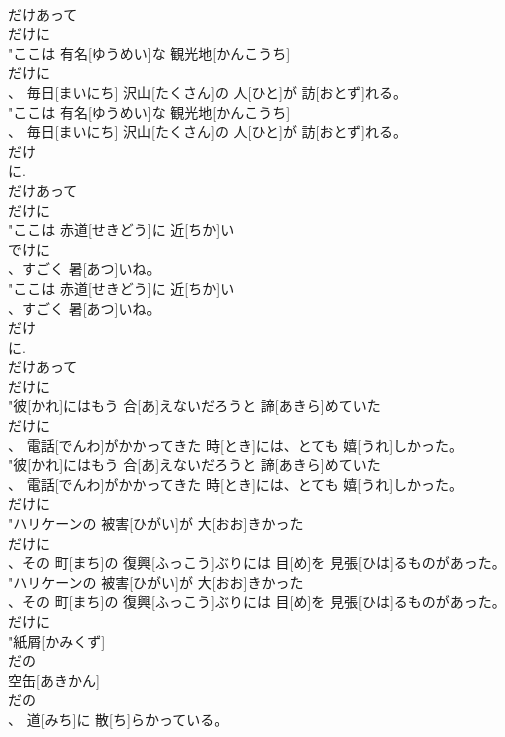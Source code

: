 \documentclass[8pt]{extreport}
\begin{document}
\begin{CJK}{UTF8}{min}
\\	だけあって	
\\	だけに
\\	"ここは 有名[ゆうめい]な 観光地[かんこうち]
\\	だけに
\\	、 毎日[まいにち] 沢山[たくさん]の 人[ひと]が 訪[おとず]れる。
\\	"ここは 有名[ゆうめい]な 観光地[かんこうち]
\\	、 毎日[まいにち] 沢山[たくさん]の 人[ひと]が 訪[おとず]れる。
\\	だけ 
\\	に. 
\\	だけあって	
\\	だけに
\\	"ここは 赤道[せきどう]に 近[ちか]い
\\	でけに
\\	、すごく 暑[あつ]いね。
\\	"ここは 赤道[せきどう]に 近[ちか]い
\\	、すごく 暑[あつ]いね。
\\	だけ 
\\	に. 
\\	だけあって	
\\	だけに
\\	"彼[かれ]にはもう 合[あ]えないだろうと 諦[あきら]めていた
\\	だけに
\\	、 電話[でんわ]がかかってきた 時[とき]には、とても 嬉[うれ]しかった。
\\	"彼[かれ]にはもう 合[あ]えないだろうと 諦[あきら]めていた
\\	、 電話[でんわ]がかかってきた 時[とき]には、とても 嬉[うれ]しかった。
\\	だけに
\\	"ハリケーンの 被害[ひがい]が 大[おお]きかった
\\	だけに
\\	、その 町[まち]の 復興[ふっこう]ぶりには 目[め]を 見張[ひは]るものがあった。
\\	"ハリケーンの 被害[ひがい]が 大[おお]きかった
\\	、その 町[まち]の 復興[ふっこう]ぶりには 目[め]を 見張[ひは]るものがあった。
\\	だけに
\\	"紙屑[かみくず]
\\	だの
\\	空缶[あきかん]
\\	だの
\\	、 道[みち]に 散[ち]らかっている。

\end{CJK}
\end{document}
